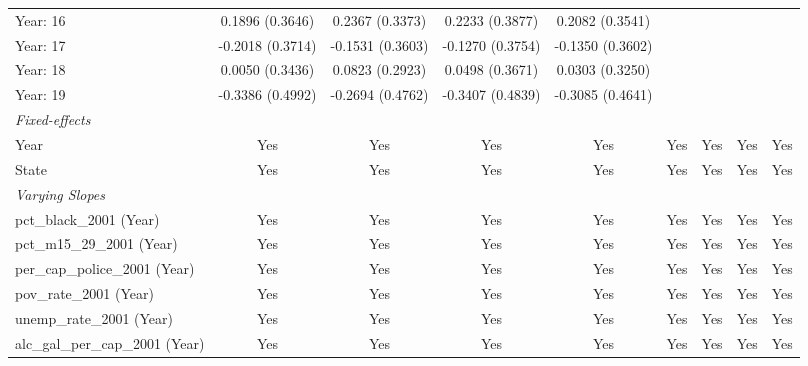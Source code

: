 \begin{tabular}{lcccccccc}
   Year: 16                            & 0.1896 (0.3646)  & 0.2367 (0.3373)  & 0.2233 (0.3877)  & 0.2082 (0.3541)  &                  &                  &                  &   \\   
   Year: 17                            & -0.2018 (0.3714) & -0.1531 (0.3603) & -0.1270 (0.3754) & -0.1350 (0.3602) &                  &                  &                  &   \\   
   Year: 18                            & 0.0050 (0.3436)  & 0.0823 (0.2923)  & 0.0498 (0.3671)  & 0.0303 (0.3250)  &                  &                  &                  &   \\   
   Year: 19                            & -0.3386 (0.4992) & -0.2694 (0.4762) & -0.3407 (0.4839) & -0.3085 (0.4641) &                  &                  &                  &   \\   
   \midrule
   \emph{Fixed-effects}\\
   Year                                & Yes              & Yes              & Yes              & Yes              & Yes              & Yes              & Yes              & Yes\\  
   State                               & Yes              & Yes              & Yes              & Yes              & Yes              & Yes              & Yes              & Yes\\  
   \midrule
   \emph{Varying Slopes}\\
   pct\_black\_2001 (Year)             & Yes              & Yes              & Yes              & Yes              & Yes              & Yes              & Yes              & Yes\\  
   pct\_m15\_29\_2001 (Year)           & Yes              & Yes              & Yes              & Yes              & Yes              & Yes              & Yes              & Yes\\  
   per\_cap\_police\_2001 (Year)       & Yes              & Yes              & Yes              & Yes              & Yes              & Yes              & Yes              & Yes\\  
   pov\_rate\_2001 (Year)              & Yes              & Yes              & Yes              & Yes              & Yes              & Yes              & Yes              & Yes\\  
   unemp\_rate\_2001 (Year)            & Yes              & Yes              & Yes              & Yes              & Yes              & Yes              & Yes              & Yes\\  
   alc\_gal\_per\_cap\_2001 (Year)     & Yes              & Yes              & Yes              & Yes              & Yes              & Yes              & Yes              & Yes\\  

\end{tabular}
